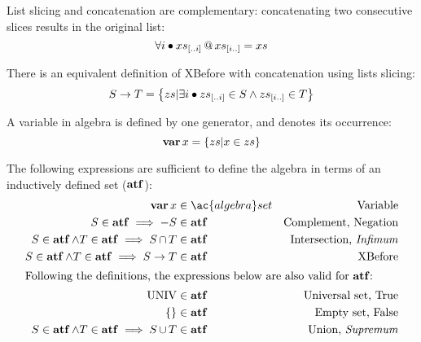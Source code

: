 \documentclass[en,twoside,onehalfspacing,phd]{risethesis}
\makeatletter
\newcommand{\sliceright}[2]{\ensuremath #1_{\left[..#2\right]}}
\newcommand{\sliceleft}[2]{\ensuremath #1_{\left[#2..\right]}}
\def\varop{\ensuremath\operatorname{\mathbf{var}}}
\newcommand{\var}[1]{\ensuremath\varop #1}
\def\xbeforeop{\ensuremath\rightarrow}
\newcommand{\xbefore}[2]{\ensuremath #1 \xbeforeop #2 }
\def\True{\ensuremath\operatorname{UNIV}}
\def\False{\ensuremath\operatorname{\left\{\right\}}}
\newcommand{\append}[2]{\ensuremath #1 \operatorname{\mathbf{@}} #2}
\def\algebraset{\ensuremath\operatorname{\mathbf{atf}}}
\newcommand{\setsin}[1]{\ensuremath\left\{ #1 \right\}}
\def\union{\ensuremath\operatorname{\cup}}
\def\inter{\ensuremath\operatorname{\cap}}
\makeatother
\begin{document}
List slicing and concatenation are complementary: concatenating two consecutive slices results in the original list:
\begin{equation}
\forall i \bullet \append{\sliceright{xs}{i}}{\sliceleft{xs}{i}} = xs
\end{equation}

There is an equivalent definition of XBefore with concatenation using lists slicing:
%
\begin{equation}
\xbefore{S}{T} =
  \setsin{
    zs | \exists i \bullet \sliceright{zs}{i} \in S \land \sliceleft{zs}{i} \in T
  }
\end{equation}

A variable in \ac{algebra} is defined by one generator, and denotes its occurrence:
%
\begin{equation}
\label{def:var}
\var{x} =
  \setsin{
    zs | x \in zs
  }
\end{equation}

The following expressions are sufficient to define the \ac{algebra} in terms of an inductively defined set ($\algebraset$):
%
\begin{subequations}
\label{def:algebraset}
\begin{align}
\var x & \in \ac{algebra}set & \text{Variable}\label{def:algebraset-var}\\
S \in \algebraset \implies -S & \in \algebraset & \text{Complement, Negation}\label{def:algebraset-compl}\\
S \in \algebraset \land T \in \algebraset \implies S \inter T & \in \algebraset & \text{Intersection, \emph{Infimum}}\label{def:algebraset-inf}\\
S \in \algebraset \land T \in \algebraset \implies \xbefore{S}{T} & \in \algebraset & \text{XBefore}\label{def:algebraset-xbefore}\\
\intertext{Following the definitions, the expressions below are also valid for $\algebraset$:}
\True &\in \algebraset & \text{Universal set, True}\label{def:algebraset-true}\\
\False &\in \algebraset & \text{Empty set, False}\label{def:algebraset-false}\\
S \in \algebraset \land T \in \algebraset \implies S \union T &\in \algebraset & \text{Union, \emph{Supremum}}\label{def:algebraset-sup}
\end{align}
\end{subequations}
\end{document}
